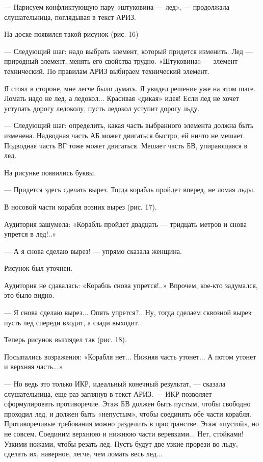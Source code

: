—  Нарисуем  конфликтующую  пару   «штуковина  —  лед»,  —  продолжала
слушательница, поглядывая в текст АРИЗ.

На доске появился такой рисунок (рис. 16)

— Следующий шаг: надо выбрать  элемент, который придется изменить. Лед
— природный элемент, менять его свойства трудно. «Штуковина» — элемент
технический. По правилам АРИЗ выбираем технический элемент.

Я стоял в стороне, мне легче было думать. Я увидел решение уже на этом
шаге. Ломать надо не лед, а ледокол... Красивая «дикая» идея! Если лед
не хочет уступать дорогу ледоколу, пусть ледокол уступит дорогу льду.

— Следующий  шаг: определить,  какая часть выбранного  элемента должна
быть изменена. Надводная часть АБ  может двигаться быстро, ей ничто не
мешает.  Подводная часть  ВГ тоже  может двигаться.  Мешает часть  БВ,
упирающаяся в лед.

На рисунке появились буквы.

— Придется здесь сделать вырез. Тогда корабль пройдет вперед, не ломая
льды.

В носовой части корабля возник вырез (рис. 17).

Аудитория  зашумела: «Корабль  пройдет  двадцать —  тридцать метров  и
снова упрется в лед!..»

— А я снова сделаю вырез! — упрямо сказала женщина.

Рисунок был уточнен.

Аудитория не  сдавалась: «Корабль  снова упрется!..»  Впрочем, кое-кто
задумался, это было видно.


— Я снова сделаю вырез...  Опять упрется?.. Ну, тогда сделаем сквозной
вырез: пусть лед спереди входит, а сзади выходит.

Теперь рисунок выглядел так (рис. 18).


Посыпались возражения: «Корабля нет...  Нижняя часть утонет... А потом
утонет и верхняя часть...»

—  Но ведь  это только  ИКР, идеальный  конечный результат,  — сказала
слушательница,  еще  раз  заглянув  в  текст  АРИЗ.  —  ИКР  позволяет
сформулировать  противоречие.  Этаж  БВ   должен  быть  пустым,  чтобы
свободно  проходил  лед, и  должен  быть  «непустым», чтобы  соединять
обе  части  корабля.  Противоречивые   требования  можно  разделить  в
пространстве. Этаж «пустой»,  но не совсем. Соединим  верхнюю и нижнюю
части  веревками... Нет,  стойками! Узкими  ножами, чтобы  резать лед.
Пусть будут  две узкие прорези  во льду, сделать их,  наверное, легче,
чем ломать весь лед...

